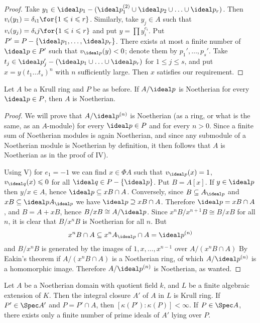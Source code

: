 \documentclass[../main]{subfiles}
\begin{document}
\begin{proof}
Take $y_1 \in \ideal p_1-(\ideal p_1^{(2)} \cup \ideal p_2 \cup \ldots \cup \ideal p_r)$. Then $v_i(y_1)=\delta_{i1}\for{1 \leqslant i \leqslant r}$. Similarly, take $y_j \in A$ such that $v_i(y_j)=\delta_i j\for{1 \leqslant i \leqslant r}$ and put $y=\prod y_i^{e_i}$. Put $P'=P-\{\ideal p_1, \ldots, \ideal p_r\}$. There exists at most a finite number of $\ideal p \in P'$ such that $v_{\ideal p}(y)<0$; denote them by $p_1', \ldots, p_s'$. Take $t_j \in \ideal p_j'-(\ideal p_1 \cup \ldots \cup \ideal p_r)$ for $1 \leqslant j \leqslant s$, and put $x=y(t_1 \ldots t_s)^n$ with $n$ sufficiently large. Then $x$ satisfies our requirement.
\end{proof}

\begin{partheorem}\label{thm:104}
Let $A$ be a Krull ring and $P$ be as before. If $A / \ideal p$ is Noetherian for every $\ideal p \in P$, then $A$ is Noetherian.
\end{partheorem}

\begin{proof}
We will prove that $A / \ideal p^{(n)}$ is Noetherian (as a ring, or what is the same, as an $A$-module) for every $\ideal p \in P$ and for every $n>0$. Since a finite sum of Noetherian modules is again Noetherian, and since any submodule of a Noetherian module is Noetherian by definition, it then follows that $A$ is Noetherian as in the proof of IV).

Using V) for $e_1=-1$ we can find $x \in \Phi A$ such that $v_{\ideal p}(x)=1$, $v_{\ideal q}(x) \leqslant 0$ for all $\ideal q \in P-\{\ideal p\}$. Put $B=A[x]$. If $y \in \ideal p$ then $y / x \in A$, hence $\ideal p \subseteq x B \cap A$. Conversely, since $B \subseteq A_{\ideal p}$ and $x B \subseteq \ideal p A_{\ideal p}$ we have $\ideal p \supseteq x B \cap A$. Therefore $\ideal p=x B \cap A$, and $B=A+x B$, hence $B / x B \cong A / \ideal p$. Since $x^nB / x^{n+1} B \cong B / x B$ for all $n$, it is clear that $B / x^n B$ is Noetherian for all $n$. But \[x^nB \cap A \subseteq x^nA_{\ideal p} \cap A=\ideal p^{(n)}\] and $B / x^nB$ is generated by the images of $1, x, \ldots, x^{n-1}$ over $A/(x^n B \cap A)$ By Eakin's theorem if $A/(x^nB \cap A)$ is a Noetherian ring, of which $A / \ideal p^{(n)}$ is a homomorphic image. Therefore $A / \ideal p^{(n)}$ is Noetherian, as wanted.
\end{proof}

\begin{theorem*}
Let $A$ be a Noetherian domain with quotient field $k$, and $L$ be a finite algebraic extension of $K$. Then the integral closure $A'$ of $A$ in $L$ is Krull ring. If $P' \in \Spec A'$ and $P=P' \cap A$, then $[\kappa(P'):\kappa(P)]<\infty$. If $P \in \Spec A$, there exists only a finite number of prime ideals of $A'$ lying over $P$.
\end{theorem*}
\end{document}
